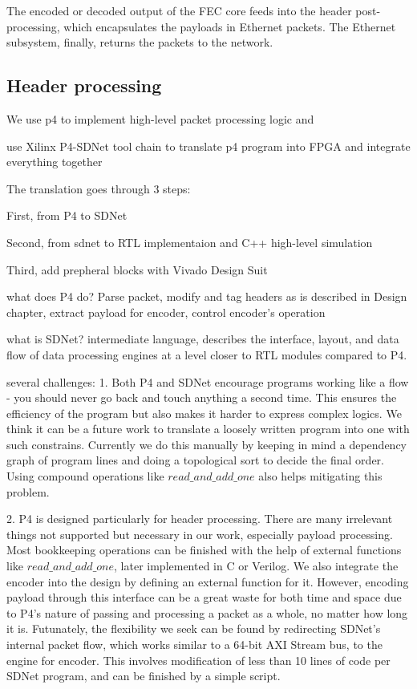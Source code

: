 The encoded or decoded output of the FEC core feeds into the header
post-processing, which encapsulates the payloads in Ethernet packets.  The
Ethernet subsystem, finally, returns the packets to the network.

\subsection{Header processing}

We use p4 to implement high-level packet processing logic and 

use Xilinx P4-SDNet tool chain to translate p4 program into FPGA and integrate everything together

The translation goes through 3 steps:

First, from P4 to SDNet

Second, from sdnet to RTL implementaion and C++ high-level simulation

Third, add prepheral blocks with Vivado Design Suit

what does P4 do?
Parse packet, modify and tag headers as is described in Design chapter, extract payload for encoder,
control encoder's operation

what is SDNet?
intermediate language, describes the interface, layout, and data flow of data processing engines
at a level closer to RTL modules compared to P4.


several challenges:
1. Both P4 and SDNet encourage programs working like a flow - you should never go back and touch anything
a second time. This ensures the efficiency of the program but also makes it harder to express complex
logics. We think it can be a future work to translate a loosely written program into one with such constrains.
Currently we do this manually by keeping in mind a dependency graph of program lines and doing a topological sort
to decide the final order. Using compound operations like $read\_and\_add\_one$ also helps mitigating this problem.

2. P4 is designed particularly for header processing. There are many irrelevant things not supported but
necessary in our work, especially payload processing. Most bookkeeping operations can be finished with the
help of external functions like $read\_and\_add\_one$, later implemented in C or Verilog. We also integrate the encoder
into the design by defining an external function for it. However, encoding payload through this interface can be a
great waste for both time and space due to P4's nature of passing and processing a packet as a whole, no matter how long it is. Futunately, the
flexibility we seek can be found by redirecting SDNet's internal packet flow, which works similar to a 64-bit AXI Stream bus,
to the engine for encoder. This involves modification of less than 10 lines of code per SDNet program, and can be finished by a simple script.


